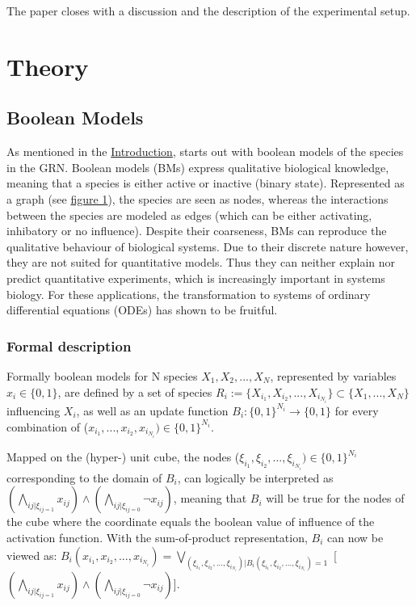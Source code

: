 \documentclass[11pt]{article}
\begin{document}
The paper closes with a discussion and the description of the experimental setup.

\section{Theory} \label{sec:Theory}
\subsection{Boolean Models}
As mentioned in the \hyperref[sec:Intro]{Introduction}, \cite{Kirkham} starts out with boolean models of the
species in the GRN. Boolean models (BMs) express qualitative biological knowledge, meaning that a species is either active or inactive (binary state). Represented as a graph (see \hyperref[regulatory_network]{figure 1}), the species are seen as nodes, whereas the interactions between the species are modeled as edges (which can be either activating, inhibatory or no influence).
Despite their coarseness, BMs can reproduce the qualitative behaviour of biological systems.
Due to their discrete nature however, they are not suited for quantitative models. Thus they can neither explain nor predict quantitative experiments, which is increasingly important in systems biology. For these applications,
the transformation to systems of ordinary differential equations (ODEs) has shown to be fruitful.

\subsubsection{Formal description}
Formally boolean models for N species $X_{1}, X_{2},..., X_{N}$, represented by variables $x_{i} \in \{0, 1\}$, are
defined by a set of species $R_{i} := \{X_{i_{1}}, X_{i_{2}},..., X_{i_{N_{i}}}\} \subset
\{X_{1},...,X_{N}\}$ influencing $X_{i}$, as well as an update function $B_{i}: \{0, 1\}^{N_{i}} \rightarrow \{0, 1\}$ for every combination of ($x_{i_{1}},..., x_{i_{2}}, x_{i_{N_{i}}}) \in \{0, 1\}^{N_{i}}$.

Mapped on the (hyper-) unit cube, the nodes ($\xi_{i_{1}},\xi_{i_{2}},..., \xi_{i_{N_{i}}}) \in \{0, 1\}^{N_{i}}$ corresponding to the domain of $B_{i}$, can logically be interpreted as $( \bigwedge_{ij| \xi_{ij = 1}} x_{ij} ) \wedge ( \bigwedge_{ij| \xi_{ij = 0}} \neg x_{ij} )$, meaning that $B_{i}$ will be true for the nodes of the cube where
the coordinate equals the boolean value of influence of the activation function.
With the sum-of-product representation, $B_{i}$ can now be viewed as: $B_{i} (x_{i_{1}}, x_{i_{2}},..., x_{i_{N_{i}}} ) = \bigvee_{(\xi_{i_{1}}, \xi_{i_{2}},..., \xi_{i_{N_{i}}}) | B_{i} ( \xi_{i_{1}}, \xi_{i_{2}},..., \xi_{i_{N_{i}}}) = 1} $ [ $( \bigwedge_{ij | \xi_{ij = 1}} x_{ij}) \wedge ( \bigwedge _{ij | \xi_{ij = 0}}  \neg x_{ij} ) $].
\end{document}
